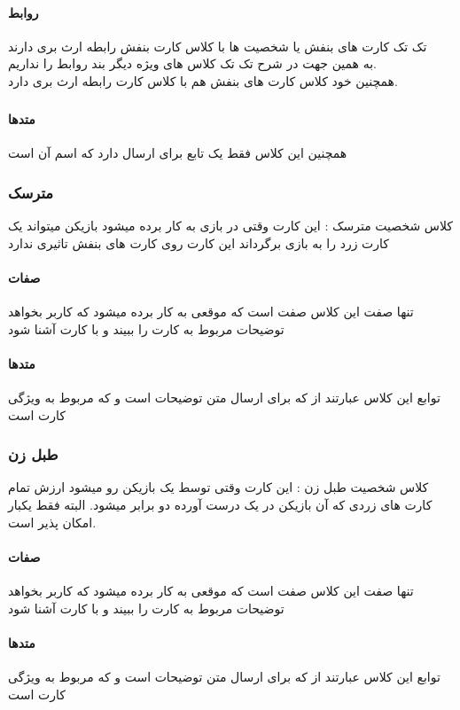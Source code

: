 \documentclass[pdf,titlepage,a4paper]{report}
\begin{document}
	\paragraph{روابط}
	تک تک کارت های بنفش یا شخصیت ها با کلاس کارت بنفش رابطه ارث بری دارند \\
	به همین جهت در شرح تک تک کلاس های ویژه دیگر بند روابط را نداریم.\\
	همچنین خود کلاس کارت های بنفش هم با کلاس کارت رابطه ارث بری دارد.\\

	\subparagraph{}
	
	\paragraph{متدها}
	همچنین این کلاس فقط یک تابع برای ارسال  دارد که اسم آن  است
	\subsubsection{مترسک}
	کلاس شخصیت مترسک : این کارت وقتی در بازی به کار برده میشود بازیکن میتواند یک کارت زرد را به بازی برگرداند 
	این کارت روی کارت های بنفش تاثیری ندارد
	\paragraph{صفات}
	 تنها  صفت این کلاس صفت   است که موقعی به کار برده میشود که کاربر بخواهد توضیحات مربوط به کارت را ببیند و با کارت آشنا شود
	 
	 \paragraph{متدها}
	 توابع این کلاس عبارتند از  
	  که برای ارسال متن توضیحات است 
	 و  که مربوط به ویژگی کارت است
	\subsubsection{طبل زن}
	 کلاس شخصیت طبل زن : این کارت وقتی توسط یک بازیکن رو میشود ارزش تمام کارت های زردی که آن بازیکن در یک درست آورده دو برابر میشود. البته فقط یکبار امکان پذیر است.

    \paragraph{صفات}
	تنها  صفت این کلاس صفت   است که موقعی به کار برده میشود که کاربر بخواهد توضیحات مربوط به کارت را ببیند و با کارت آشنا شود
	\paragraph{متدها}
	توابع این کلاس عبارتند از  
	 که برای ارسال متن توضیحات است 
	و  که مربوط به ویژگی کارت است
\end{document}

